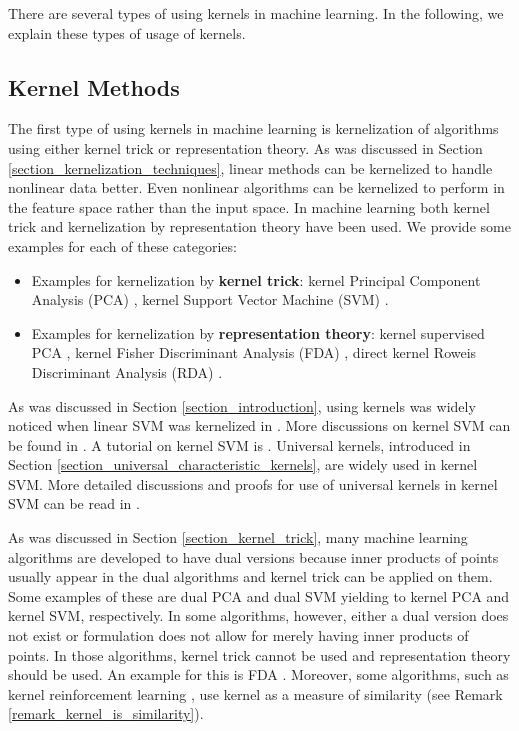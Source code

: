 \documentclass[lang=cn,10pt]{gorgeousnbook}
\numberwithin{equation}{section}%
\numberwithin{figure}{section}%
\begin{document}
There are several types of using kernels in machine learning. In the following, we explain these types of usage of kernels. 

\subsection{Kernel Methods}

The first type of using kernels in machine learning is kernelization of algorithms using either kernel trick or representation theory. As was discussed in Section \ref{section_kernelization_techniques}, linear methods can be kernelized to handle nonlinear data better. Even nonlinear algorithms can be kernelized to perform in the feature space rather than the input space.
In machine learning both kernel trick and kernelization by representation theory have been used. We provide some examples for each of these categories: 
\begin{itemize}[topsep=0pt,itemsep=-1ex,partopsep=1ex,parsep=1ex]
\item Examples for kernelization by \textbf{kernel trick}: kernel Principal Component Analysis (PCA) \cite{scholkopf1997kernel,scholkopf1998nonlinear,ghojogh2019unsupervised}, kernel Support Vector Machine (SVM) \cite{boser1992training,vapnik1995nature}.
\item Examples for kernelization by \textbf{representation theory}: kernel supervised PCA \cite{barshan2011supervised,ghojogh2019unsupervised}, kernel Fisher Discriminant Analysis (FDA) \cite{mika1999fisher,ghojogh2019fisher}, direct kernel Roweis Discriminant Analysis (RDA) \cite{ghojogh2020generalized}. 
\end{itemize}

As was discussed in Section \ref{section_introduction}, using kernels was widely noticed when linear SVM \cite{vapnik1974theory} was kernelized in \cite{boser1992training,vapnik1995nature}.
More discussions on kernel SVM can be found in \cite{scholkopf1997comparing,hastie2009elements}. A tutorial on kernel SVM is \cite{burges1998tutorial}. 
Universal kernels, introduced in Section \ref{section_universal_characteristic_kernels}, are widely used in kernel SVM. More detailed discussions and proofs for use of universal kernels in kernel SVM can be read in \cite{steinwart2008support}.

As was discussed in Section \ref{section_kernel_trick}, many machine learning algorithms are developed to have dual versions because inner products of points usually appear in the dual algorithms and kernel trick can be applied on them. Some examples of these are dual PCA \cite{scholkopf1997kernel,scholkopf1998nonlinear,ghojogh2019unsupervised} and dual SVM \cite{boser1992training,vapnik1995nature} yielding to kernel PCA and kernel SVM, respectively. 
In some algorithms, however, either a dual version does not exist or formulation does not allow for merely having inner products of points. In those algorithms, kernel trick cannot be used and representation theory should be used. An example for this is FDA \cite{ghojogh2019fisher}.
Moreover, some algorithms, such as kernel reinforcement learning \cite{ormoneit2002kernel}, use kernel as a measure of similarity (see Remark \ref{remark_kernel_is_similarity}).
\end{document}
